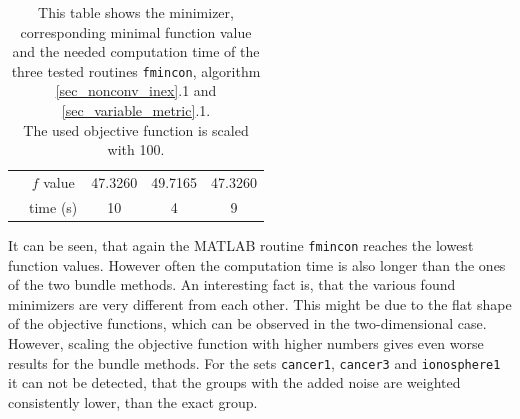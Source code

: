 \begin{table}[ht]
\begin{tabular}{|l|c|c|c|c|}
	& \(f\) value & 47.3260 & 49.7165 & 47.3260\\
	& time (s)& 10 & 4 & 9\\
	\hline
\end{tabular}
\caption[Minimizer, function value and computation time for the multigroup problem]{This table shows the minimizer, corresponding minimal function value and the needed computation time of the three tested routines \textup{\texttt{fmincon}}, algorithm \ref{sec_nonconv_inex}.1 and \ref{sec_variable_metric}.1.\\
The used objective function is scaled with 100.}
\label{tab_MG}
\end{table}

It can be seen, that again the MATLAB routine \texttt{fmincon} reaches the lowest function values. However often the computation time is also longer than the ones of the two bundle methods.
An interesting fact is, that the various found minimizers are very different from each other.
This might be due to the flat shape of the objective functions, which can be observed in the two-dimensional case.
However, scaling the objective function with higher numbers gives even worse results for the bundle methods.
For the sets \texttt{cancer1}, \texttt{cancer3} and \texttt{ionosphere1} it can not be detected, that the groups with the added noise are weighted consistently lower, than the exact group.


